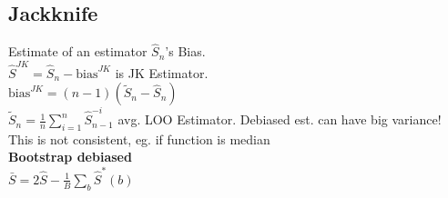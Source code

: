 \subsection*{Jackknife}
Estimate of an estimator $\hat{S}_n$'s Bias.\\
$\hat{S}^{JK}=\hat{S}_n-\mathrm{bias}^{JK}$ is JK Estimator.\\
$\mathrm{bias}^{JK}{=}(n{-}1)(\tilde{S}_n{-}\hat{S}_n)$\\
$\tilde{S}_n{=}\frac{1}{n}\sum_{i=1}^n\hat{S}_{n{-}1}^{-i}$ avg. LOO Estimator.
Debiased est. can have big variance! This is not consistent, eg. if function is median\\
\textbf{Bootstrap debiased}\\ $\bar{S}{=}2\hat{S}{-}\frac{1}{B}\sum_b\hat{S}^*(b)$
%

